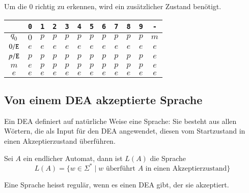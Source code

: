 \begin{beispiel} Um die $0$ richtig zu erkennen,
wird ein zusätzlicher Zustand benötigt.

\begin{center}
\begin{tabular}{|c|ccccccccccc|}
\hline
&\tt 0&\tt 1&\tt 2&\tt 3&\tt 4&\tt 5&\tt 6&\tt 7&\tt 8&\tt 9&\tt -\\
\hline
$q_0$&$0$&$p$&$p$&$p$&$p$&$p$&$p$&$p$&$p$&$p$&$m$\\
$0{\tt /E}$&$e$&$e$&$e$&$e$&$e$&$e$&$e$&$e$&$e$&$e$&$e$\\
$p{\tt /E}$&$p$&$p$&$p$&$p$&$p$&$p$&$p$&$p$&$p$&$p$&$e$\\
$m$&$e$&$p$&$p$&$p$&$p$&$p$&$p$&$p$&$p$&$p$&$e$\\
$e$&$e$&$e$&$e$&$e$&$e$&$e$&$e$&$e$&$e$&$e$&$e$\\
\hline
\end{tabular}
\end{center}

\end{beispiel}

\subsection{Von einem DEA akzeptierte Sprache\label{regulaer:akzeptiertesprache}}
%
Ein DEA definiert auf natürliche Weise eine Sprache: Sie besteht aus
allen Wörtern, die als Input für den DEA angewendet, diesen vom
Startzustand in einen Akzeptierzustand überführen.

\begin{definition}
Sei $A$ ein endlicher Automat, dann ist $L(A)$ die Sprache
\[
L(A)=\{w\in\Sigma^*\;|\; \text{$w$ überführt $A$ in einen Akzeptierzustand}\}
\]
\end{definition}

\begin{definition}
\label{regulaer:definition:regulaere-sprache}
%
Eine Sprache heisst regulär, wenn es einen DEA gibt, der sie
akzeptiert.
\end{definition}

